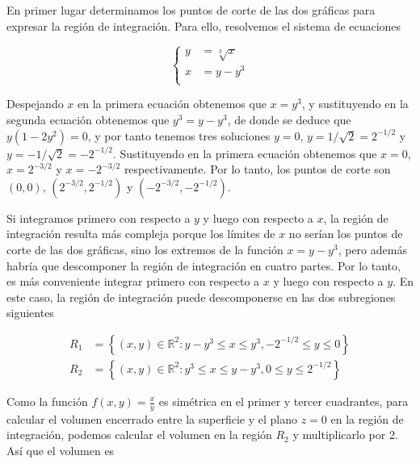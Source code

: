\documentclass[
  spanish,
  a4paper,
]{scrreport}
\theoremstyle{definition}
\theoremstyle{remark}
\begin{document}
\begin{tcolorbox}[enhanced jigsaw, colbacktitle=quarto-callout-tip-color!10!white, opacityback=0, toptitle=1mm, title=\textcolor{quarto-callout-tip-color}{\faLightbulb}\hspace{0.5em}{Solución}, coltitle=black, opacitybacktitle=0.6, breakable, toprule=.15mm, leftrule=.75mm, titlerule=0mm, colframe=quarto-callout-tip-color-frame, left=2mm, bottomrule=.15mm, bottomtitle=1mm, arc=.35mm, rightrule=.15mm, colback=white]

En primer lugar determinamos los puntos de corte de las dos gráficas
para expresar la región de integración. Para ello, resolvemos el sistema
de ecuaciones

\[
\begin{cases}
y &= \sqrt[3]{x}\\
x &= y-y^3 \\
\end{cases}
\]

Despejando \(x\) en la primera ecuación obtenemos que \(x=y^3\), y
sustituyendo en la segunda ecuación obtenemos que \(y^3 = y-y^3\), de
donde se deduce que \(y(1-2y^2)=0\), y por tanto tenemos tres soluciones
\(y=0\), \(y=1/\sqrt{2}=2^{-1/2}\) y \(y=-1/\sqrt{2}=-2^{-1/2}\).
Sustituyendo en la primera ecuación obtenemos que \(x=0\),
\(x=2^{-3/2}\) y \(x=-2^{-3/2}\) respectivamente. Por lo tanto, los
puntos de corte son \((0,0)\), \((2^{-3/2}, 2^{-1/2})\) y
\((-2^{-3/2}, -2^{-1/2})\).

Si integramos primero con respecto a \(y\) y luego con respecto a \(x\),
la región de integración resulta más compleja porque los límites de
\(x\) no serían los puntos de corte de las dos gráficas, sino los
extremos de la función \(x=y-y^3\), pero además habría que descomponer
la región de integración en cuatro partes. Por lo tanto, es más
conveniente integrar primero con respecto a \(x\) y luego con respecto a
\(y\). En este caso, la región de integración puede descomponerse en las
dos subregiones siguientes

\begin{align*}
R_1 &= \left\{ (x,y) \in \mathbb{R}^2:  y-y^3 \leq x \leq y^3, -2^{-1/2} \leq y \leq 0 \right\} \\
R_2 &= \left\{ (x,y) \in \mathbb{R}^2:  y^3 \leq x \leq y-y^3, 0 \leq y \leq 2^{-1/2} \right\}
\end{align*}

Como la función \(f(x,y)=\frac{x}{y}\) es simétrica en el primer y
tercer cuadrantes, para calcular el volumen encerrado entre la
superficie y el plano \(z=0\) en la región de integración, podemos
calcular el volumen en la región \(R_2\) y multiplicarlo por 2. Así que
el volumen es


\end{tcolorbox}
\end{document}

